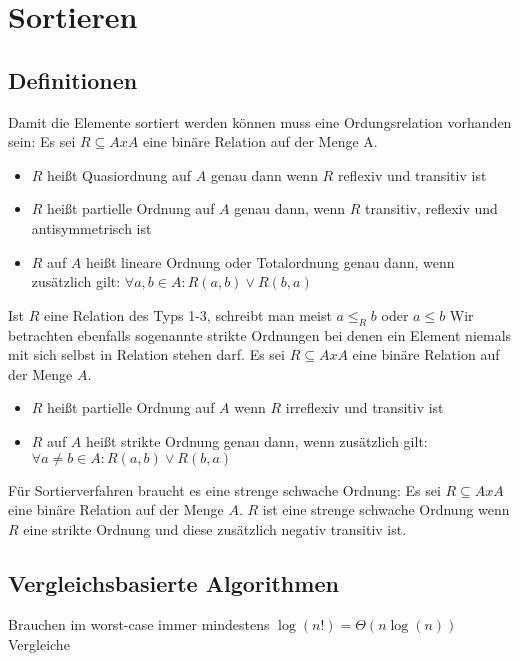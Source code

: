 	\section{Sortieren}
	\subsection{Definitionen}
	Damit die Elemente sortiert werden können muss eine Ordungsrelation vorhanden sein: \newline \newline
	Es sei $R\subseteq AxA$ eine binäre Relation auf der Menge A.
	\begin{itemize}
		\item $R$ heißt Quasiordnung auf $A$ genau dann wenn $R$ reflexiv und transitiv ist
		\item $R$ heißt partielle Ordnung auf $A$ genau dann, wenn $R$ transitiv, reflexiv und antisymmetrisch ist
		\item $R$ auf $A$ heißt lineare Ordnung oder Totalordnung genau dann, wenn zusätzlich gilt: $\forall a, b\in A:R(a, b)\lor R(b, a)$
	\end{itemize}
	Ist $R$ eine Relation des Typs 1-3, schreibt man meist $a\leq_Rb$ oder $a\leq b$ \newline
	Wir betrachten ebenfalls sogenannte strikte Ordnungen bei denen ein Element niemals mit sich selbst in Relation  stehen darf. \newline \newline
	Es sei $R\subseteq AxA$ eine binäre Relation auf der Menge $A$.
	\begin{itemize}
	  \item $R$ heißt partielle Ordnung auf $A$ wenn $R$ irreflexiv und transitiv ist
	  \item $R$ auf $A$ heißt strikte Ordnung genau dann, wenn zusätzlich gilt: \newline
	  		$\forall a\not= b\in A:R(a,b)\lor R(b,a)$
	\end{itemize} 
	Für Sortierverfahren braucht es eine strenge schwache Ordnung: \newline \newline
	Es sei $R\subseteq AxA$ eine binäre Relation auf der Menge $A$. $R$ ist eine strenge schwache Ordnung wenn $R$ eine strikte Ordnung und diese zusätzlich negativ transitiv ist.
	\newpage
	\subsection{Vergleichsbasierte Algorithmen}
	Brauchen im worst-case immer mindestens $\log(n!)=\Theta(n\log(n))$ Vergleiche
